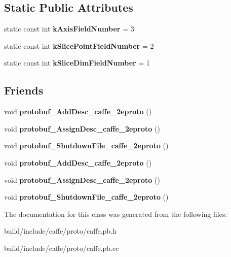 \subsection*{Static Public Attributes}
\begin{DoxyCompactItemize}
\item 
\mbox{\label{classcaffe_1_1_slice_parameter_af04b58f7fe29e5bd8a88c884426eb0c1}} 
static const int {\bfseries k\+Axis\+Field\+Number} = 3
\item 
\mbox{\label{classcaffe_1_1_slice_parameter_ae428ec52718c83cc20f17ce14331d0aa}} 
static const int {\bfseries k\+Slice\+Point\+Field\+Number} = 2
\item 
\mbox{\label{classcaffe_1_1_slice_parameter_af7264158f40a536e6038c9b54f67ced3}} 
static const int {\bfseries k\+Slice\+Dim\+Field\+Number} = 1
\end{DoxyCompactItemize}
\subsection*{Friends}
\begin{DoxyCompactItemize}
\item 
\mbox{\label{classcaffe_1_1_slice_parameter_a2670a9c8ffd0e5105cf7522cd6f8613d}} 
void {\bfseries protobuf\+\_\+\+Add\+Desc\+\_\+caffe\+\_\+2eproto} ()
\item 
\mbox{\label{classcaffe_1_1_slice_parameter_a7f145bddbdde78003d27e42c7e003d23}} 
void {\bfseries protobuf\+\_\+\+Assign\+Desc\+\_\+caffe\+\_\+2eproto} ()
\item 
\mbox{\label{classcaffe_1_1_slice_parameter_a026784a8e4e76f1b4daf9d033d2ece83}} 
void {\bfseries protobuf\+\_\+\+Shutdown\+File\+\_\+caffe\+\_\+2eproto} ()
\item 
\mbox{\label{classcaffe_1_1_slice_parameter_a2670a9c8ffd0e5105cf7522cd6f8613d}} 
void {\bfseries protobuf\+\_\+\+Add\+Desc\+\_\+caffe\+\_\+2eproto} ()
\item 
\mbox{\label{classcaffe_1_1_slice_parameter_a7f145bddbdde78003d27e42c7e003d23}} 
void {\bfseries protobuf\+\_\+\+Assign\+Desc\+\_\+caffe\+\_\+2eproto} ()
\item 
\mbox{\label{classcaffe_1_1_slice_parameter_a026784a8e4e76f1b4daf9d033d2ece83}} 
void {\bfseries protobuf\+\_\+\+Shutdown\+File\+\_\+caffe\+\_\+2eproto} ()
\end{DoxyCompactItemize}


The documentation for this class was generated from the following files\+:\begin{DoxyCompactItemize}
\item 
build/include/caffe/proto/caffe.\+pb.\+h\item 
build/include/caffe/proto/caffe.\+pb.\+cc\end{DoxyCompactItemize}
